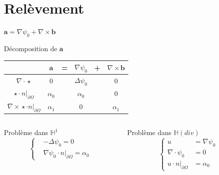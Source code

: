 \documentclass{beamer}
\newcommand{\HH}{{\mathbb{H}}}
\newcommand{\grad}{{\nabla}}
\newcommand{\laplace}{{\Delta}}
\newcommand{\rot}{{\nabla\times}}
\newcommand{\diverg}{{\nabla\cdot}}
\newcommand{\restr}{{\big\rvert_{\partial\Omega}}}
\begin{document}
\section{Relèvement}
\begin{frame}{$\mathbf{a}=\grad\psi_0+\rot \mathbf{b}$}
\begin{block}{Décomposition de $\mathbf{a}$}
\begin{center}
\begin{tabular}{c|ccccc}
& $\mathbf{a}$ & = & $\grad\psi_0$ & + & $\rot \mathbf{b}$ \\ \hline
$\diverg\star$ & 0 & & $\laplace\psi_0$ & & 0\\ \hline
$\star\cdot n\restr$ & $\alpha_0$ & & $\alpha_0$ & & 0\\ \hline
$\rot\star\cdot n\restr$ & $\alpha_1$ & & 0 & & $\alpha_1$
\end{tabular}
\end{center}
\end{block}
\begin{columns}[t]
\begin{column}{5cm}
\begin{block}{Problème dans $\HH^1$}
\[\left\{
\begin{aligned}
&-\laplace\psi_0 = 0\\
&\grad\psi_0\cdot n\restr=\alpha_0
\end{aligned}
\right.\]
\end{block}
\end{column}
\begin{column}{5cm}
\begin{block}{Problème dans $\HH(div)$}
\[\left\{
\begin{aligned}
u &= \grad \psi_0\\
\diverg\psi_0 &= 0\\
u\cdot n\restr &= \alpha_0
\end{aligned}
\right.\]
\end{block}
\end{column}
\end{columns}
\end{frame}
\end{document}
